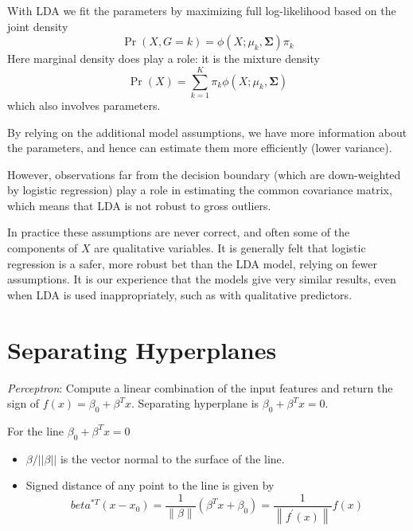 With LDA we fit the parameters by maximizing full log-likelihood based on the joint 
density
\begin{equation*}
    \operatorname{Pr}(X, G=k)=\phi\left(X ; \mu_{k}, \mathbf{\Sigma}\right) \pi_{k}
\end{equation*}
Here marginal density does play a role: it is the mixture density
\begin{equation*}
    \operatorname{Pr}(X)=\sum_{k=1}^{K} \pi_{k} \phi\left(X ; \mu_{k}, 
    \mathbf{\Sigma}\right)
\end{equation*}
which also involves parameters.

By relying
on the additional model assumptions, we have more information about the
parameters, and hence can estimate them more efficiently (lower variance).

However, observations far from the decision boundary (which are
down-weighted by logistic regression) play a role in estimating the common
covariance matrix, which means that LDA is not robust to gross outliers. 

In practice these assumptions are never correct, and often some of the
components of $X$ are qualitative variables. It is generally felt that logistic
regression is a safer, more robust bet than the LDA model, relying on fewer
assumptions. It is our experience that the models give very similar results,
even when LDA is used inappropriately, such as with qualitative predictors.

\section{Separating Hyperplanes}
\textit{Perceptron}: Compute a linear combination of the input features and return 
the sign of $f(x)=\beta_0+\beta^Tx$. Separating hyperplane is $\beta_0+\beta^Tx=0$. 

For the line $\beta_0+\beta^Tx=0$
\begin{itemize}
\item $\beta/||\beta||$ is the vector normal to the surface of the line. 
\item Signed distance of any point to the line is given by
\begin{equation*}
beta^{* T}\left(x-x_{0}\right)
=\frac{1}{\|\beta\|}\left(\beta^{T} x+\beta_{0}\right)
=\frac{1}{\left\|f^{\prime}(x)\right\|} f(x)
\end{equation*}
\end{itemize}

